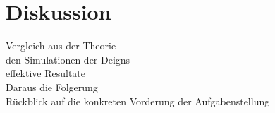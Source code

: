 \section{Diskussion}
Vergleich aus der Theorie\\
den Simulationen der Deigns\\
effektive Resultate\\

Daraus die Folgerung\\

Rückblick auf die konkreten Vorderung der Aufgabenstellung